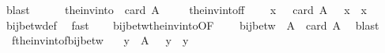 \begin{isabellebody}
\ blast\isanewline
\ \ \isamarkupfalse%
\ {\isacharquery}{\kern0pt}{\isasymgamma}{\isacharprime}{\kern0pt}\ {\isacharequal}{\kern0pt}\ {\isachardoublequoteopen}the{\isacharunderscore}{\kern0pt}inv{\isacharunderscore}{\kern0pt}into\ {\isacharbraceleft}{\kern0pt}{\isachardot}{\kern0pt}{\isachardot}{\kern0pt}{\isacharless}{\kern0pt}\ card\ A{\isacharbraceright}{\kern0pt}\ {\isasymgamma}{\isachardoublequoteclose}\isanewline
\ \ \isamarkupfalse%
\ the{\isacharunderscore}{\kern0pt}inv{\isacharunderscore}{\kern0pt}into{\isacharunderscore}{\kern0pt}f{\isacharunderscore}{\kern0pt}f\ {}\ \isamarkupfalse%
\ {}{\isacharcolon}{\kern0pt}\ {\isachardoublequoteopen}{\isasymforall}x\ {\isasymin}\ {\isacharbraceleft}{\kern0pt}{\isachardot}{\kern0pt}{\isachardot}{\kern0pt}{\isacharless}{\kern0pt}\ card\ A{\isacharbraceright}{\kern0pt}{\isachardot}{\kern0pt}\ {\isacharquery}{\kern0pt}{\isasymgamma}{\isacharprime}{\kern0pt}\ {\isacharparenleft}{\kern0pt}{\isasymgamma}\ x{\isacharparenright}{\kern0pt}\ {\isacharequal}{\kern0pt}\ x{\isachardoublequoteclose}\ \isamarkupfalse%
\ bij{\isacharunderscore}{\kern0pt}betw{\isacharunderscore}{\kern0pt}def\ \isamarkupfalse%
\ fast\isanewline
\ \ \isamarkupfalse%
\ bij{\isacharunderscore}{\kern0pt}betw{\isacharunderscore}{\kern0pt}the{\isacharunderscore}{\kern0pt}inv{\isacharunderscore}{\kern0pt}into{\isacharbrackleft}{\kern0pt}OF\ {}{\isacharbrackright}{\kern0pt}\ \isamarkupfalse%
\ {}{\isacharcolon}{\kern0pt}\ {\isachardoublequoteopen}bij{\isacharunderscore}{\kern0pt}betw\ {\isacharquery}{\kern0pt}{\isasymgamma}{\isacharprime}{\kern0pt}\ A\ {\isacharbraceleft}{\kern0pt}{\isachardot}{\kern0pt}{\isachardot}{\kern0pt}{\isacharless}{\kern0pt}\ card\ A{\isacharbraceright}{\kern0pt}{\isachardoublequoteclose}\ \isamarkupfalse%
\ blast\isanewline
\ \ \isamarkupfalse%
\ {}\ f{\isacharunderscore}{\kern0pt}the{\isacharunderscore}{\kern0pt}inv{\isacharunderscore}{\kern0pt}into{\isacharunderscore}{\kern0pt}f{\isacharunderscore}{\kern0pt}bij{\isacharunderscore}{\kern0pt}betw\ \isamarkupfalse%
\ {}{\isacharcolon}{\kern0pt}\ {\isachardoublequoteopen}{\isasymforall}y\ {\isasymin}\ A{\isachardot}{\kern0pt}\ {\isasymgamma}\ {\isacharparenleft}{\kern0pt}{\isacharquery}{\kern0pt}{\isasymgamma}{\isacharprime}{\kern0pt}\ y{\isacharparenright}{\kern0pt}\ {\isacharequal}{\kern0pt}\ y{\isachardoublequoteclose}\ \isamarkupfalse%

\end{isabellebody}
